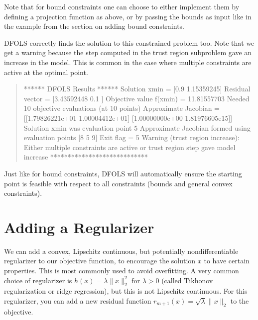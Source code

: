 \documentclass[letterpaper,10pt,english]{sphinxmanual}
\begin{document}
\begin{quote}
\begin{sphinxVerbatim}[commandchars=\\\{\}]
\end{sphinxVerbatim}
\end{quote}

\sphinxAtStartPar
Note that for bound constraints one can choose to either implement them by defining a projection function as above, or by passing the bounds as input like in the example from the section on adding bound constraints.

\sphinxAtStartPar
DFO\sphinxhyphen{}LS correctly finds the solution to this constrained problem too. Note that we get a warning because the step computed in the trust region subproblem
gave an increase in the model. This is common in the case where multiple constraints are active at the optimal point.
\begin{quote}

\begin{sphinxVerbatim}[commandchars=\\\{\}]
****** DFO\PYGZhy{}LS Results ******
Solution xmin = [0.9        1.15359245]
Residual vector = [3.43592448 0.1       ]
Objective value f(xmin) = 11.81557703
Needed 10 objective evaluations (at 10 points)
Approximate Jacobian = [[\PYGZhy{}1.79826221e+01  1.00004412e+01]
 [\PYGZhy{}1.00000000e+00 \PYGZhy{}1.81976605e\PYGZhy{}15]]
Solution xmin was evaluation point 5
Approximate Jacobian formed using evaluation points [8 5 9]
Exit flag = 5
Warning (trust region increase): Either multiple constraints are active or trust region step gave model increase
****************************
\end{sphinxVerbatim}
\end{quote}

\sphinxAtStartPar
Just like for bound constraints, DFO\sphinxhyphen{}LS will automatically ensure the starting point is feasible with respect to all constraints (bounds and general convex constraints).


\section{Adding a Regularizer}
\label{\detokenize{userguide:adding-a-regularizer}}
\sphinxAtStartPar
We can add a convex, Lipschitz continuous, but potentially non\sphinxhyphen{}differentiable regularizer to our objective function, to encourage the solution \(x\) to have certain properties.
This is most commonly used to avoid overfitting.
A very common choice of regularizer is \(h(x)=\lambda\|x\|_2^2\) for \(\lambda>0\) (called Tikhonov regularization or ridge regression), but this is not Lipschitz continuous. For this regularizer, you can add a new residual function \(r_{m+1}(x)=\sqrt{\lambda}\|x\|_2\) to the objective.
\end{document}
